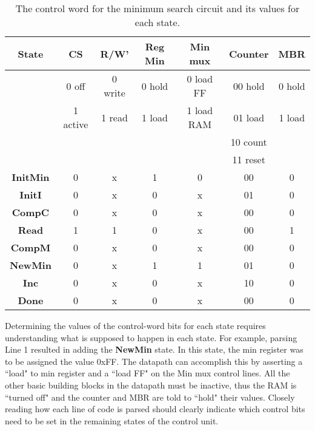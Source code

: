 \begin{table}
\begin{tabular}{c||c|c|c|c|c|c}  
\textbf{ State}   & CS       & R/W'   &  Reg Min  & Min mux       & Counter & MBR	\\ \hline
        & 0 off    & 0 write&  0 hold   & 0 load FF     & 00 hold & 0 hold	\\ \hline
        & 1 active & 1 read &  1 load   & 1 load RAM    & 01 load & 1 load	\\ \hline
        &          &        &           &               & 10 count& 		\\ \hline
        &          &        &           &               & 11 reset& \\ \hline \hline
\textbf{ InitMin } & 0        &    x   & 1         & 0             & 00      & 0   \\ \hline
\textbf{ InitI }  & 0        &    x   & 0         & x             & 01      & 0   \\ \hline
\textbf{ CompC }  & 0        &    x   & 0         & x             & 00      & 0   \\ \hline
\textbf{ Read  }  & 1        &    1   & 0         & x             & 00      & 1   \\ \hline
\textbf{ CompM }  & 0        &    x   & 0         & x             & 00      & 0   \\ \hline
\textbf{ NewMin }  & 0        &    x   & 1         & 1             & 01      & 0   \\ \hline
\textbf{ Inc  }   & 0        &    x   & 0         & x             & 10      & 0   \\ \hline
\textbf{ Done }   & 0        &    x   & 0         & x             & 00      & 0   \\ 
\end{tabular}
\caption{The control word for the minimum search circuit and its values for each state.}
\label{table:MinSearch}
\end{table}

Determining the values of the control-word bits for each state 
requires understanding what is supposed to happen in each 
state.  For example, parsing Line 1 resulted in adding the 
\textbf{ NewMin} state.  In this state, the min register was
to be assigned the value 0xFF.  The datapath can accomplish
this by asserting a ``load" to min register and a ``load FF" on the 
Min mux control lines.  All the other basic building blocks 
in the datapath must be inactive, thus the RAM is ``turned off"
and the counter and MBR are told to ``hold" their values.
Closely reading how each line of code is parsed should clearly
indicate which control bits need to be set in the remaining states
of the control unit.

